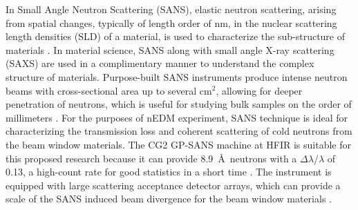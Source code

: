 In Small Angle Neutron Scattering (SANS), elastic neutron scattering, arising from spatial changes, typically of length order of nm, in the nuclear scattering length densities (SLD) of a material, is used to characterize the sub-structure of materials \cite{Pynn1990, Hammouda2008, Feigin2013, Glinka2004}. In material science, SANS along with small angle X-ray scattering (SAXS) are used in a complimentary manner to understand the complex structure of materials. Purpose-built SANS instruments produce intense neutron beams with cross-sectional area up to several cm$^2$, allowing for deeper penetration of neutrons, which is useful for studying bulk samples on the order of millimeters \cite{Feigin2013}. For the purposes of nEDM experiment, SANS technique is ideal for characterizing the transmission loss and coherent scattering of cold neutrons from the beam window materials. The CG2 GP-SANS machine at HFIR is suitable for this proposed research because it can provide 8.9~\AA\ neutrons with a $\Delta \lambda$/$\lambda$ of 0.13, a high-count rate for good statistics in a short time \cite{Wignall2012, Heller2018}. The instrument is equipped with large scattering acceptance detector arrays, which can provide a scale of the SANS induced beam divergence for the beam window materials \cite{Wignall2012, Heller2018}.

    
